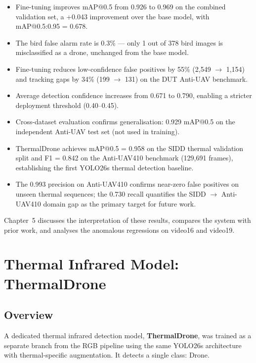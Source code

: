 \documentclass[12pt,a4paper]{report}
\begin{document}
\begin{itemize}
  \item Fine-tuning improves mAP@0.5 from 0.926 to 0.969 on the combined validation
        set, a +0.043 improvement over the base model, with mAP@0.5:0.95 = 0.678.
  \item The bird false alarm rate is 0.3\% --- only 1 out of 378 bird images
        is misclassified as a drone, unchanged from the base model.
  \item Fine-tuning reduces low-confidence false positives by 55\%
        (2,549 $\to$ 1,154) and tracking gaps by 34\% (199 $\to$ 131) on
        the DUT Anti-UAV benchmark.
  \item Average detection confidence increases from 0.671 to 0.790,
        enabling a stricter deployment threshold (0.40--0.45).
  \item Cross-dataset evaluation confirms generalisation: 0.929 mAP@0.5
        on the independent Anti-UAV test set (not used in training).
  \item ThermalDrone achieves mAP@0.5 = 0.958 on the SIDD thermal validation
        split and F1 = 0.842 on the Anti-UAV410 benchmark (129,691 frames),
        establishing the first YOLO26s thermal detection baseline.
  \item The 0.993 precision on Anti-UAV410 confirms near-zero false positives
        on unseen thermal sequences; the 0.730 recall quantifies the SIDD
        $\to$ Anti-UAV410 domain gap as the primary target for future work.
\end{itemize}

Chapter~5 discusses the interpretation of these results, compares the
system with prior work, and analyses the anomalous regressions on
video16 and video19.

\section{Thermal Infrared Model: ThermalDrone}
\label{sec:thermal_results}

\subsection{Overview}

A dedicated thermal infrared detection model, \textbf{ThermalDrone}, was
trained as a separate branch from the RGB pipeline using the same YOLO26s
architecture with thermal-specific augmentation. It detects a single class: Drone.
\end{document}
